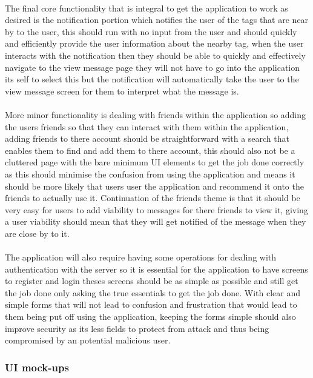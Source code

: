 \\
The final core functionality that is integral to get the application to work as desired is the notification portion which notifies the user of the tags that are near by to the user, this should run with no input from the user and should quickly and efficiently provide the user information about the nearby tag, when the user interacts with the notification then they should be able to quickly and effectively navigate to the view message page they will not have to go into the application its self to select this but the notification will automatically take the user to the view message screen for them to interpret what the message is.\\
\\
More minor functionality is dealing with friends within the application so adding the users friends so that they can interact with them within the application, adding friends to there account should be straightforward with a search that enables them to find and add them to there account, this should also not be a cluttered page with the bare minimum UI elements to get the job done correctly as this should minimise the confusion from using the application and means it should be more likely that users user the application and recommend it onto the friends to actually use it. Continuation of the friends theme is that it should be very easy for users to add viability to messages for there friends to view it, giving a user viability should mean that they will get notified of the message when they are close by to it.\\
\\
The application will also require having some operations for dealing with authentication with the server so it is essential for the application to have screens to register and login theses screens should be as simple as possible and still get the job done only asking the true essentials to get the job done. With clear and simple forms that will not lead to confusion and frustration that would lead to them being put off using the application, keeping the forms simple should also improve security as its less fields to protect from attack and thus being compromised by an potential malicious user.\\

\subsubsection*{UI mock-ups}

